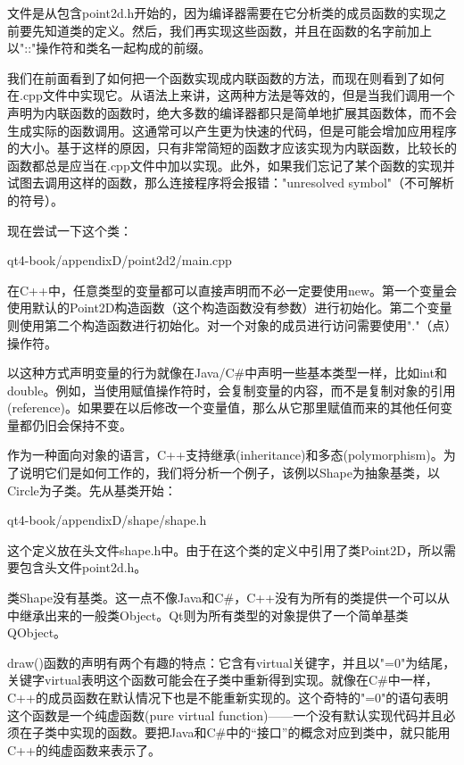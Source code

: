 \documentclass[11pt,oneside]{book}
\begin{document}
\begin{common-format}
文件是从包含point2d.h开始的，因为编译器需要在它分析类的成员函数的实现之前要先知道类的定义。然后，我们再实现这些函数，并且在函数的名字前加上以"::"操作符和类名一起构成的前缀。

我们在前面看到了如何把一个函数实现成内联函数的方法，而现在则看到了如何在.cpp文件中实现它。从语法上来讲，这两种方法是等效的，但是当我们调用一个声明为内联函数的函数时，绝大多数的编译器都只是简单地扩展其函数体，而不会生成实际的函数调用。这通常可以产生更为快速的代码，但是可能会增加应用程序的大小。基于这样的原因，只有非常简短的函数才应该实现为内联函数，比较长的函数都总是应当在.cpp文件中加以实现。此外，如果我们忘记了某个函数的实现并试图去调用这样的函数，那么连接程序将会报错："unresolved symbol"（不可解析的符号）。

现在尝试一下这个类：
\begin{cppinput}{qt4-book/appendixD/point2d2/main.cpp}
\end{cppinput}

在C++中，任意类型的变量都可以直接声明而不必一定要使用new。第一个变量会使用默认的Point2D构造函数（这个构造函数没有参数）进行初始化。第二个变量则使用第二个构造函数进行初始化。对一个对象的成员进行访问需要使用"."（点）操作符。

以这种方式声明变量的行为就像在Java/C\#{}中声明一些基本类型一样，比如int和double。例如，当使用赋值操作符时，会复制变量的内容，而不是复制对象的引用(reference)。如果要在以后修改一个变量值，那么从它那里赋值而来的其他任何变量都仍旧会保持不变。

作为一种面向对象的语言，C++支持继承(inheritance)和多态(polymorphism)。为了说明它们是如何工作的，我们将分析一个例子，该例以Shape为抽象基类，以Circle为子类。先从基类开始：

\begin{cppinput}{qt4-book/appendixD/shape/shape.h}
\end{cppinput}

这个定义放在头文件shape.h中。由于在这个类的定义中引用了类Point2D，所以需要包含头文件point2d.h。

类Shape没有基类。这一点不像Java和C\#{}，C++没有为所有的类提供一个可以从中继承出来的一般类Object。Qt则为所有类型的对象提供了一个简单基类QObject。

draw()函数的声明有两个有趣的特点：它含有virtual关键字，并且以"=0"为结尾，关键字virtual表明这个函数可能会在子类中重新得到实现。就像在C\#{}中一样，C++的成员函数在默认情况下也是不能重新实现的。这个奇特的"=0"的语句表明这个函数是一个纯虚函数(pure virtual function)——一个没有默认实现代码并且必须在子类中实现的函数。要把Java和C\#{}中的“接口”的概念对应到类中，就只能用C++的纯虚函数来表示了。


\end{common-format}
\end{document}
